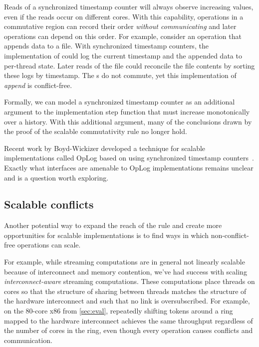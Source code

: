 Reads of a synchronized timestamp counter will always observe
increasing values, even if the reads occur on different cores.
%
%
With this capability, operations in a commutative region can record
their order \emph{without communicating} and later operations can
depend on this order.
%
For example, consider an  operation that appends data to
a file.  With synchronized timestamp counters, the implementation of
 could log the current timestamp and the appended data to
per-thread state.  Later reads of the file could reconcile the file
contents by sorting these logs by timestamp.  The s do
not commute, yet this implementation of \emph{append} is
conflict-free.

Formally, we can model a synchronized timestamp counter as an
additional argument to the implementation step function that must increase
monotonically over a history.  With this additional argument, many of
the conclusions drawn by the proof of the scalable commutativity rule
no longer hold.

Recent work by Boyd-Wickizer developed a technique for scalable
implementations called OpLog based on using synchronized timestamp
counters~\cite{boyd-wickizer:thesis}.  Exactly what interfaces are
amenable to OpLog implementations remains unclear and is a question
worth exploring.


\subsection{Scalable conflicts}


Another potential way to expand the reach of the rule and create more
opportunities for scalable implementations is to find ways in which
non-conflict-free operations can scale.

For example, while streaming computations are in general not linearly
scalable because of interconnect and memory contention, we've had
success with scaling \emph{interconnect-aware} streaming computations.
%
These computations place threads on cores so that the structure of
sharing between threads matches the structure of the hardware
interconnect and such that no link is oversubscribed.
%
For example, on the 80-core x86 from \cref{sec:eval}, repeatedly
shifting tokens around a ring mapped to the hardware interconnect
achieves the same throughput regardless of the number of cores in the
ring, even though every operation causes conflicts and communication.

